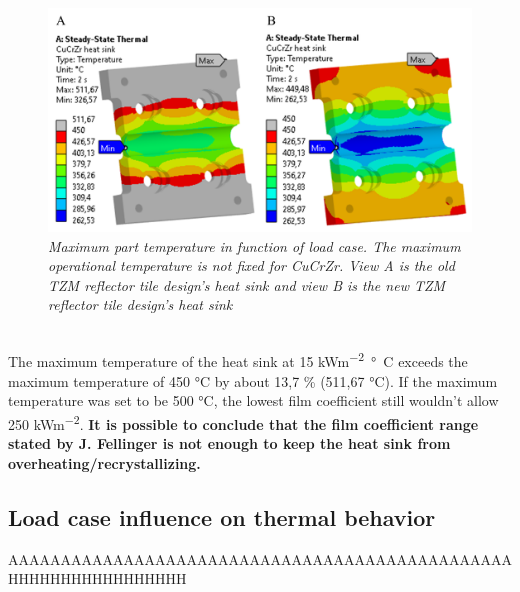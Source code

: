 \\
\begin{figure}[h!]
    \label{fig_5_8} 
    \centering
    \includegraphics[width=1\textwidth]{figures/filmcoefficient15and30TEMPERATREFRINGEHS.png}
    \caption{\it Maximum part temperature in function of load case. The maximum operational temperature is not fixed for \acrshort{CuCrZr}. View A is the old \acrshort{TZM} reflector tile design's heat sink and view B is the new \acrshort{TZM} reflector tile design's heat sink}
\end{figure}
\\
\normalsize{\indent The maximum temperature of the heat sink at 15 \unit{kWm^{-2}\si{\degree}C} exceeds the maximum temperature of 450 \unit{\si{\degree}}C \cite{Fellinger_2013} \cite{zhu_parametric_2019} by about 13,7 \% (511,67 \unit{\si{\degree}}C). If the maximum temperature was set to be 500 \unit{\si{\degree}}C, the lowest film coefficient still wouldn't allow 250 \unit{kWm^{-2}}. {\bfseries It is possible to conclude that the film coefficient range stated by J. Fellinger is not enough to keep the heat sink from overheating/recrystallizing.}}
\subsection{Load case influence on thermal behavior}
\Huge{AAAAAAAAAAAAAAAAAAAAAAAAAAAAAAAAAAAAAAAAAAAAAAAAHHHHHHHHHHHHHHHHH}